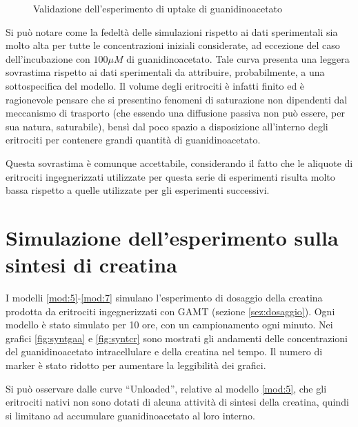\begin{figure}[H]
{
	}
	\caption{Validazione dell'esperimento di uptake di guanidinoacetato}
	\label{fig:uptake}
\end{figure}
Si pu\`o notare come la fedelt\`a delle simulazioni rispetto ai dati sperimentali sia molto alta per tutte le concentrazioni iniziali considerate, ad eccezione del caso dell'incubazione con $100 \mu M$ di guanidinoacetato.
Tale curva presenta una leggera sovrastima rispetto ai dati sperimentali da attribuire, probabilmente, a una sottospecifica del modello.
Il volume degli eritrociti \`e infatti finito ed \`e ragionevole pensare che si presentino fenomeni di saturazione non dipendenti dal meccanismo di trasporto (che essendo una diffusione passiva non pu\`o essere, per sua natura, saturabile), bens\`i dal poco spazio a disposizione all'interno degli eritrociti per contenere grandi quantit\`a di guanidinoacetato.

Questa sovrastima \`e comunque accettabile, considerando il fatto che le aliquote di eritrociti ingegnerizzati utilizzate per questa serie di esperimenti risulta molto bassa rispetto a quelle utilizzate per gli esperimenti successivi.

\section{Simulazione dell'esperimento sulla sintesi di creatina}\label{sez:simsint}
	I modelli \ref{mod:5}-\ref{mod:7} simulano l'esperimento di dosaggio della creatina prodotta da eritrociti ingegnerizzati con GAMT (sezione \ref{sez:dosaggio}).
	Ogni modello \`e stato simulato per 10 ore, con un campionamento ogni minuto.
	Nei grafici \ref{fig:syntgaa} e \ref{fig:syntcr} sono mostrati gli andamenti delle concentrazioni del guanidinoacetato intracellulare e della creatina nel tempo.
	Il numero di marker \`e stato ridotto per aumentare la leggibilit\`a dei grafici.
	
	Si pu\`o osservare dalle curve ``Unloaded'', relative al modello \ref{mod:5}, che gli eritrociti nativi non sono dotati di alcuna attivit\`a di sintesi della creatina, quindi si limitano ad accumulare guanidinoacetato al loro interno.
	
